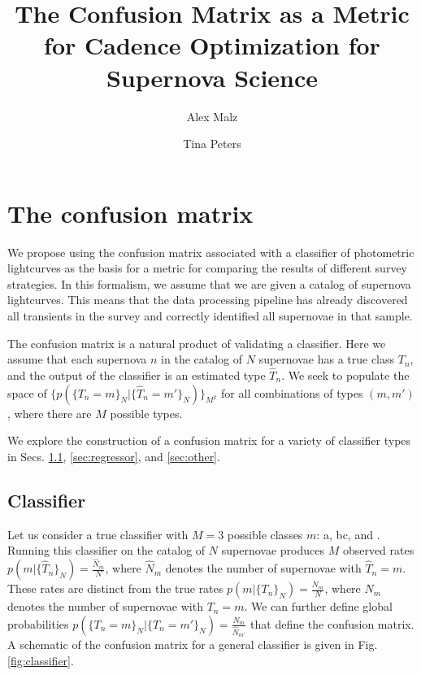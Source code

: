 \documentclass[12pt, onecolumn]{emulateapj}
\newcommand{\RN}[1]{%
	\textup{\uppercase\expandafter{\romannumeral#1}}%
}
\begin{document}
\title{The Confusion Matrix as a Metric for Cadence Optimization for Supernova Science}

\author{Alex Malz}
\author{Tina Peters}


\section{The confusion matrix}

We propose using the confusion matrix associated with a classifier of photometric lightcurves as the basis for a metric for comparing the results of different survey strategies.  In this formalism, we assume that we are given a catalog of supernova lightcurves.  This means that the data processing pipeline has already discovered all transients in the survey and correctly identified all supernovae in that sample.

The confusion matrix is a natural product of validating a classifier.  Here we assume that each supernova $n$ in the catalog of $N$ supernovae has a true class $T_{n}$, and the output of the classifier is an estimated type $\hat{T}_{n}$.  We seek to populate the space of $\{p(\{T_{n}=m\}_{N}|\{\hat{T}_{n}=m'\}_{N})\}_{M^{2}}$ for all combinations of types $(m, m')$, where there are $M$ possible types.

We explore the construction of a confusion matrix for a variety of classifier types in Secs. \ref{sec:classifier}, \ref{sec:regressor}, and \ref{sec:other}.

\subsection{Classifier}
\label{sec:classifier}

Let us consider a true classifier with $M=3$ possible classes $m$: \RN{1}a, \RN{1}bc, and \RN{2}.  Running this classifier on the catalog of $N$ supernovae produces $M$ observed rates $p(m|\{\hat{T}_{n}\}_{N})=\frac{\hat{N}_{m}}{N}$, where $\hat{N}_{m}$ denotes the number of supernovae with $\hat{T}_{n}=m$.  These rates are distinct from the true rates $p(m|\{T_{n}\}_{N})=\frac{N_{m}}{N}$, where $N_{m}$ denotes the number of supernovae with $T_{n}=m$.  We can further define global probabilities $p(\{T_{n}=m\}_{N}|\{\hat{T}_{n}=m'\}_{N})=\frac{N_{m}}{\hat{N}_{m'}}$ that define the confusion matrix.  A schematic of the confusion matrix for a general classifier is given in Fig. \ref{fig:classifier}.
\end{document}

